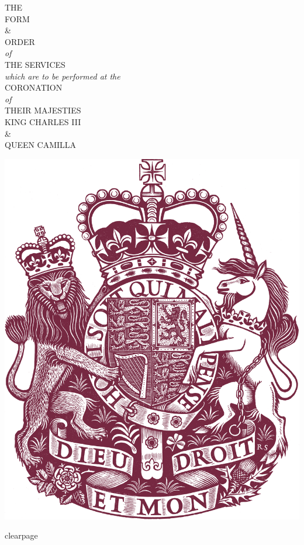 \thispagestyle{empty}
\color{qred} 
\mbox{}\vfill
{\begin{center}

\LARGE  
{\scshape\MakeUppercase{The}}\\
{\scshape\MakeUppercase{Form}}\\ 
 \&\\{\scshape\MakeUppercase{Order}}\\
\normalfont\textit{of}\\
{\scshape\MakeUppercase{The Services}}\\
\normalfont\textit{which are to be performed at the}\\
{\scshape CORONATION}\\
 \textit{of}\\
\textsc{THEIR MAJESTIES}\\
KING CHARLES III\\
\&
\\
\textsc{QUEEN CAMILLA}

\vfill 

\includegraphics[width=.475\textwidth]{greatest-coa-qred.png}

\end{center}
\vfill

\clearpage\mbox{}\thispagestyle{empty}\setcounter{page}{0}clearpage
\normalfont
\color{black}


\vfill




\vfill {}
\vfill{}
\vfill 
{}

\vfill

\begin{center}
	\Large{}		\caslorn{24}		
\end{center}
\begin{center}
	\Large{}		\caslorn{24}		
\end{center}



}
